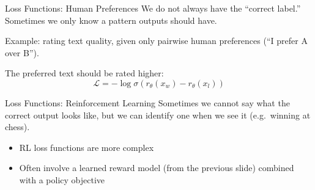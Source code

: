 \documentclass[aspectratio=169]{beamer}
\begin{document}
\begin{frame}{Loss Functions: Human Preferences}
We do not always have the ``correct label.''
Sometimes we only know a pattern outputs should have.
\vspace{0.5em}

Example: rating text quality, given only pairwise human preferences (``I prefer A over B'').
\vspace{0.5em}

The preferred text should be rated higher:
$$\mathcal{L} = -\log \sigma(r_\theta(x_w) - r_\theta(x_l))$$
\hfill{\tiny \cite{christiano2017}}\quad
\end{frame}

\begin{frame}{Loss Functions: Reinforcement Learning}
Sometimes we cannot say what the correct output looks like, but we can identify one when we see it (e.g.\ winning at chess).
\vspace{0.5em}

\begin{itemize}
\item RL loss functions are more complex
\item Often involve a learned reward model (from the previous slide) combined with a policy objective
\end{itemize}
\end{frame}
\end{document}
